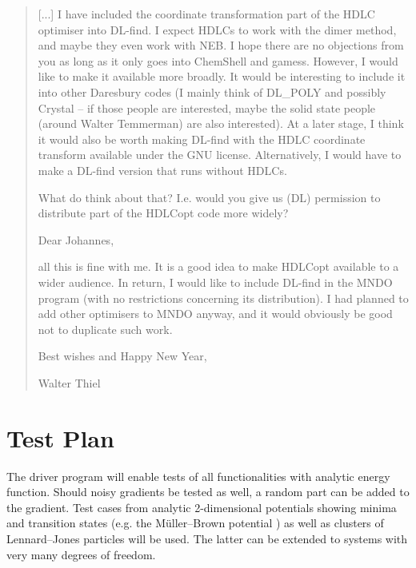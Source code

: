 \documentclass{article}
\begin{document}
\begin{quote}
  [...] I have included the coordinate transformation part of the HDLC
  optimiser into DL-find. I expect HDLCs to work with the dimer method, and
  maybe they even work with NEB. I hope there are no objections from you as
  long as it only goes into ChemShell and gamess.  However, I would like to
  make it available more broadly. It would be interesting to include it into
  other Daresbury codes (I mainly think of DL\_POLY and possibly Crystal -- if
  those people are interested, maybe the solid state people (around Walter
  Temmerman) are also interested).  At a later stage, I think it would also be
  worth making DL-find with the HDLC coordinate transform available under the
  GNU license.  Alternatively, I would have to make a DL-find version that
  runs without HDLCs.
  
  What do think about that? I.e. would you give us (DL) permission to
  distribute part of the HDLCopt code more widely?

  Dear Johannes,
  
  all this is fine with me. It is a good idea to make HDLCopt available to a
  wider audience. In return, I would like to include DL-find in the MNDO
  program (with no restrictions concerning its distribution). I had planned to
  add other optimisers to MNDO anyway, and it would obviously be good not to
  duplicate such work.

  Best wishes and Happy New Year,

  Walter Thiel

\end{quote}

\section{Test Plan}

The driver program will enable tests of all functionalities with analytic
energy function. Should noisy gradients be tested as well, a random part can
be added to the gradient. Test cases from analytic 2-dimensional potentials
showing minima and transition states (e.g. the M\"uller--Brown potential
\cite{mul79}) as well as clusters of Lennard--Jones particles will be used.
The latter can be extended to systems with very many degrees of freedom.

\end{document}

